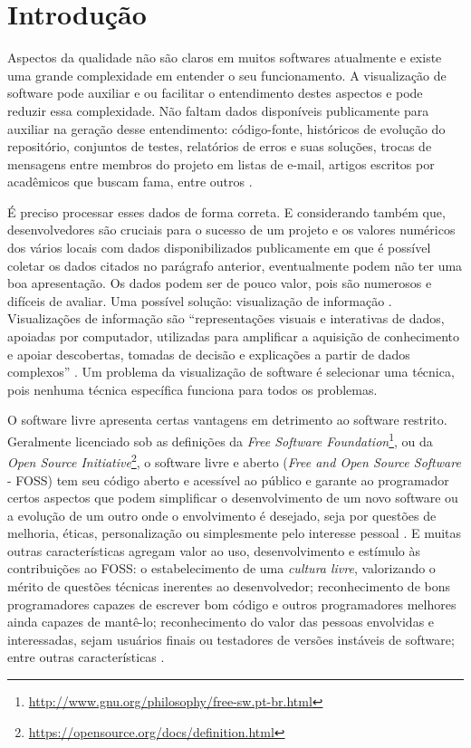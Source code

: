 \chapter{Introdução}


Aspectos da qualidade não são claros em muitos softwares atualmente e existe
uma grande complexidade em entender o seu funcionamento. A visualização de
software pode auxiliar e ou facilitar o entendimento destes aspectos e pode
reduzir essa complexidade. Não faltam dados disponíveis publicamente para
auxiliar na geração desse entendimento: código-fonte, históricos de evolução do
repositório, conjuntos de testes, relatórios de erros e suas soluções, trocas
de mensagens entre membros do projeto em listas de e-mail, artigos escritos por
acadêmicos que buscam fama, entre outros \cite{messias2012}
\cite{benkler2006wealth}.

É preciso processar esses dados de forma correta. E considerando também que,
desenvolvedores são cruciais para o sucesso de um projeto e os valores
numéricos dos vários locais com dados disponibilizados publicamente em que é
possível coletar os dados citados no parágrafo anterior, eventualmente podem não ter
uma boa apresentação. Os dados podem ser de pouco valor, pois são numerosos e
difíceis de avaliar. Uma possível solução: visualização de informação
\cite{messias2012}. Visualizações de informação são ``representações visuais e
interativas de dados, apoiadas por computador, utilizadas para amplificar a
aquisição de conhecimento e apoiar descobertas, tomadas de decisão e
explicações a partir de dados complexos'' \cite{card1999readings}. Um problema
da visualização de software é selecionar uma técnica, pois nenhuma técnica
específica funciona para todos os problemas.


O software livre apresenta certas vantagens em detrimento ao software restrito.
Geralmente licenciado sob as definições da
\textit{Free Software Foundation}\footnote{\url{http://www.gnu.org/philosophy/free-sw.pt-br.html}},
ou da \textit{Open Source Initiative}\footnote{\url{https://opensource.org/docs/definition.html}},
o software livre e aberto (\textit{Free and Open Source Software} - FOSS) tem
seu código aberto e acessível ao público e garante ao programador certos
aspectos que podem simplificar o desenvolvimento de um novo software ou a
evolução de um outro onde o envolvimento é desejado, seja por questões de
melhoria, éticas, personalização ou simplesmente pelo interesse pessoal
\cite{meirelles2013monitoramento}. E muitas outras características agregam
valor ao uso, desenvolvimento e estímulo às contribuições ao FOSS: o
estabelecimento de uma \textit{cultura livre}, valorizando o mérito de questões
técnicas inerentes ao desenvolvedor; reconhecimento de bons programadores
capazes de escrever bom código e outros programadores melhores ainda capazes de
mantê-lo; reconhecimento do valor das pessoas envolvidas e interessadas, sejam
usuários finais ou testadores de versões instáveis de software; entre outras
características \cite{raymond1999cathedral}.


